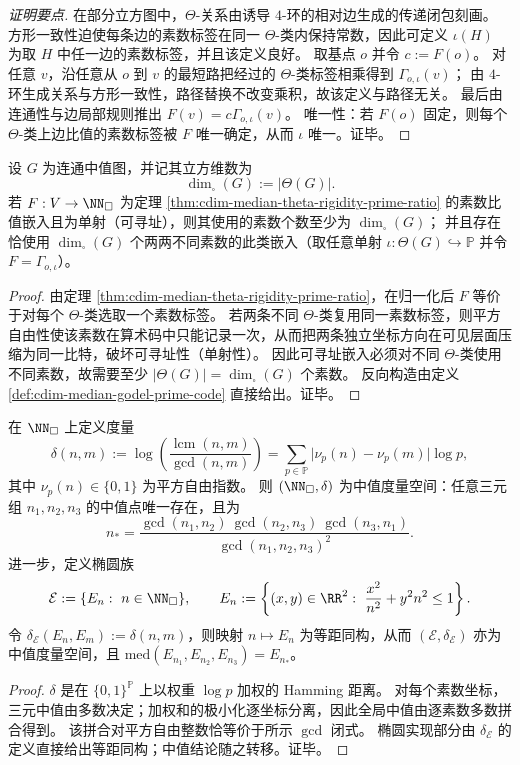 \begin{proof}[证明要点]
在部分立方图中，\(\Theta\)-关系由诱导 \(4\)-环的相对边生成的传递闭包刻画。
方形一致性迫使每条边的素数标签在同一 \(\Theta\)-类内保持常数，因此可定义 \(\iota(H)\) 为取 \(H\) 中任一边的素数标签，并且该定义良好。
取基点 \(o\) 并令 \(c:=F(o)\)。
对任意 \(v\)，沿任意从 \(o\) 到 \(v\) 的最短路把经过的 \(\Theta\)-类标签相乘得到 \(\Gamma_{o,\iota}(v)\)；
由 \(4\)-环生成关系与方形一致性，路径替换不改变乘积，故该定义与路径无关。
最后由连通性与边局部规则推出 \(F(v)=c\Gamma_{o,\iota}(v)\)。
唯一性：若 \(F(o)\) 固定，则每个 \(\Theta\)-类上边比值的素数标签被 \(F\) 唯一确定，从而 \(\iota\) 唯一。证毕。
\end{proof}

\begin{corollary}[可寻址性约束下的最小素数谱与立方维数]\label{cor:cdim-median-min-prime-spectrum-cube-dimension}
设 \(G\) 为连通中值图，并记其立方维数为
\[
\dim_{\square}(G):=|\Theta(G)|.
\]
若 \(F:V\to\NN_{\square}\) 为定理 \ref{thm:cdim-median-theta-rigidity-prime-ratio} 的素数比值嵌入且为单射（可寻址），则其使用的素数个数至少为 \(\dim_{\square}(G)\)；
并且存在恰使用 \(\dim_{\square}(G)\) 个两两不同素数的此类嵌入（取任意单射 \(\iota:\Theta(G)\hookrightarrow\mathbb P\) 并令 \(F=\Gamma_{o,\iota}\)）。
\end{corollary}

\begin{proof}
由定理 \ref{thm:cdim-median-theta-rigidity-prime-ratio}，在归一化后 \(F\) 等价于对每个 \(\Theta\)-类选取一个素数标签。
若两条不同 \(\Theta\)-类复用同一素数标签，则平方自由性使该素数在算术码中只能记录一次，从而把两条独立坐标方向在可见层面压缩为同一比特，破坏可寻址性（单射性）。
因此可寻址嵌入必须对不同 \(\Theta\)-类使用不同素数，故需要至少 \(|\Theta(G)|=\dim_{\square}(G)\) 个素数。
反向构造由定义 \ref{def:cdim-median-godel-prime-code} 直接给出。证毕。
\end{proof}

\begin{theorem}[平方自由素数寄存器上的加权中值度量与椭圆实现]\label{thm:cdim-squarefree-median-metric-ellipse-realization}
在 \(\NN_{\square}\) 上定义度量
\[
\delta(n,m):=\log\!\left(\frac{\operatorname{lcm}(n,m)}{\gcd(n,m)}\right)
=\sum_{p\in\mathbb P}\bigl|\nu_p(n)-\nu_p(m)\bigr|\log p,
\]
其中 \(\nu_p(n)\in\{0,1\}\) 为平方自由指数。
则 \((\NN_{\square},\delta)\) 为中值度量空间：任意三元组 \(n_1,n_2,n_3\) 的中值点唯一存在，且为
\[
n_\ast=
\frac{\gcd(n_1,n_2)\ \gcd(n_2,n_3)\ \gcd(n_3,n_1)}
{\gcd(n_1,n_2,n_3)^2}.
\]
进一步，定义椭圆族
\[
\mathcal E:=\{E_n:\ n\in\NN_{\square}\},
\qquad
E_n:=\left\{(x,y)\in\RR^2:\ \frac{x^2}{n^2}+y^2n^2\le 1\right\}.
\]
令 \(\delta_{\mathcal E}(E_n,E_m):=\delta(n,m)\)，则映射 \(n\mapsto E_n\) 为等距同构，从而 \((\mathcal E,\delta_{\mathcal E})\) 亦为中值度量空间，且
\(
\mathrm{med}(E_{n_1},E_{n_2},E_{n_3})=E_{n_\ast}
\)。
\end{theorem}

\begin{proof}
\(\delta\) 是在 \(\{0,1\}^{\mathbb P}\) 上以权重 \(\log p\) 加权的 Hamming 距离。
对每个素数坐标，三元中值由多数决定；加权和的极小化逐坐标分离，因此全局中值由逐素数多数拼合得到。
该拼合对平方自由整数恰等价于所示 \(\gcd\) 闭式。
椭圆实现部分由 \(\delta_{\mathcal E}\) 的定义直接给出等距同构；中值结论随之转移。证毕。
\end{proof}

\endinput

